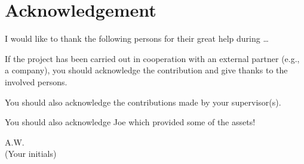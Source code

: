 \chapter*{Acknowledgement}
I would like to thank the following persons for their great help during \ldots

If the project has been carried out in cooperation with an external partner (e.g., a company), you should acknowledge the contribution and give thanks to the involved persons.

You should also acknowledge the contributions made by your supervisor(s).

You should also acknowledge Joe which provided some of the assets!

\begin{flushright}
A.W.\\[1pc]
(Your initials)
\end{flushright}